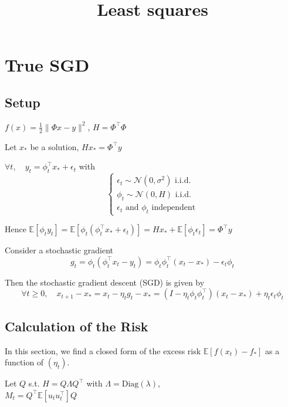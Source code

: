 \documentclass{article}
\title{Least squares}
\author{
}
\date{}
\newcommand{\diag}{\mathrm{Diag}}
\newcommand{\E}{\mathbb{E}}
\begin{document}
\maketitle





\section{True SGD}

\subsection{Setup}

$f(x) = \frac{1}{2} \|\Phi x - y\|^2$, $H = \Phi^\top \Phi$

Let $x_*$ be a solution, $Hx_* = \Phi^\top y$

\bigskip

$\forall t, \quad y_t = \phi_t^\top x_* + \epsilon_t$ with 
\[\left\{
\begin{array}{l}
\epsilon _t \sim \mathcal N(0, \sigma^2) \text{ i.i.d.}\\
\phi_t \sim \mathcal N(0, H) \text{ i.i.d.}\\
\epsilon_t \text{ and } \phi_t \text{ independent}
\end{array}\right.
\]

Hence $\E[\phi_t y_t] = \E[\phi_t(\phi_t^\top x_* + \epsilon_t)] = Hx_* + \E[\phi_t \epsilon_t] = \Phi^\top y$

\bigskip

Consider a stochastic gradient
\[
g_t = \phi_t(\phi_t^\top x_t - y_t) = \phi_t \phi_t^\top (x_t - x_*) -\epsilon_t  \phi_t 
\]

Then the stochastic gradient descent (SGD) is given by
\[
\forall t \geq 0, \quad x_{t+1}-x_* = x_t - \eta_t g_t - x_* =  (I-\eta_t \phi_t \phi_t^\top)(x_t-x_*) + \eta_t \epsilon_t \phi_t
\]


\subsection{Calculation of the Risk}

In this section, we find a closed form of the excess risk $\E[f(x_t)-f_*]$ as a function of $(\eta_t)$.

\bigskip

Let $Q$ s.t. $H = Q\Lambda Q^\top$ with $\Lambda = \diag(\lambda)$,\\
$M_t= Q^\top \E[u_tu_t^\top] Q $
\end{document}
